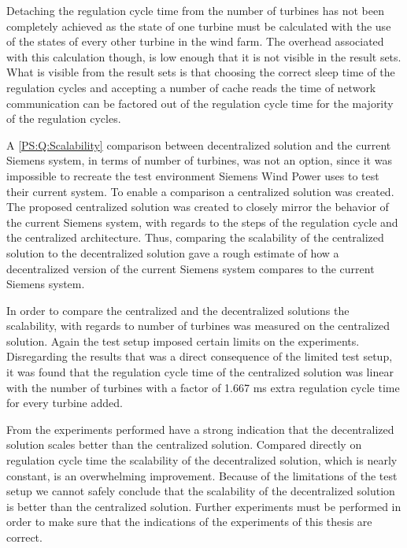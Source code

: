 Detaching the regulation cycle time from the number of turbines has not been completely achieved as the state of one turbine must be calculated with the use of the states of every other turbine in the wind farm. The overhead associated with this calculation though, is low enough that it is not visible in the result sets. What is visible from the result sets is that choosing the correct sleep time of the regulation cycles and accepting a number of cache reads the time of network communication can be factored out of the regulation cycle time for the majority of the regulation cycles.

A \ref{PS:Q:Scalability} comparison between decentralized solution and the current Siemens system, in terms of number of turbines, was not an option, since it was impossible to recreate the test environment Siemens Wind Power uses to test their current system. To enable a comparison a centralized solution was created. The proposed centralized solution was created to closely mirror the behavior of the current Siemens system, with regards to the steps of the regulation cycle and the centralized architecture. Thus, comparing the scalability of the centralized solution to the decentralized solution gave a rough estimate of how a decentralized version of the current Siemens system compares to the current Siemens system.

In order to compare the centralized and the decentralized solutions the scalability, with regards to number of turbines was measured on the centralized solution. Again the test setup imposed certain limits on the experiments. Disregarding the results that was a direct consequence of the limited test setup, it was found that the regulation cycle time of the centralized solution was linear with the number of turbines with a factor of 1.667 ms extra regulation cycle time for every turbine added.

From the experiments performed have a strong indication that the decentralized solution scales better than the centralized solution. Compared directly on regulation cycle time the scalability of the decentralized solution, which is nearly constant, is an overwhelming improvement. Because of the limitations of the test setup we cannot safely conclude that the scalability of the decentralized solution is better than the centralized solution. Further experiments must be performed in order to make sure that the indications of the experiments of this thesis are correct.

